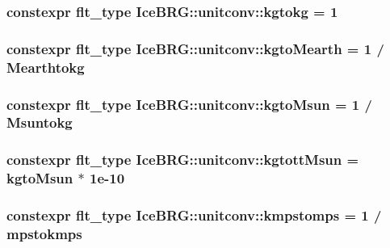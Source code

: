 \subsubsection[{kgtokg}]{\setlength{\rightskip}{0pt plus 5cm}constexpr {\bf flt\+\_\+type} Ice\+B\+R\+G\+::unitconv\+::kgtokg = 1}\label{namespaceIceBRG_1_1unitconv_a41a582b56116556e72f9829566bec57d}
\hypertarget{namespaceIceBRG_1_1unitconv_ab8172f1f5b66af0f35fea42d06f7695c}{}
\subsubsection[{kgto\+Mearth}]{\setlength{\rightskip}{0pt plus 5cm}constexpr {\bf flt\+\_\+type} Ice\+B\+R\+G\+::unitconv\+::kgto\+Mearth = 1 / {\bf Mearthtokg}}\label{namespaceIceBRG_1_1unitconv_ab8172f1f5b66af0f35fea42d06f7695c}
\hypertarget{namespaceIceBRG_1_1unitconv_a13a6d3d3f1bd4d738865aafccea48518}{}
\subsubsection[{kgto\+Msun}]{\setlength{\rightskip}{0pt plus 5cm}constexpr {\bf flt\+\_\+type} Ice\+B\+R\+G\+::unitconv\+::kgto\+Msun = 1 / {\bf Msuntokg}}\label{namespaceIceBRG_1_1unitconv_a13a6d3d3f1bd4d738865aafccea48518}
\hypertarget{namespaceIceBRG_1_1unitconv_ac142dc85ba36f5c8934dd8f92519733d}{}
\subsubsection[{kgtott\+Msun}]{\setlength{\rightskip}{0pt plus 5cm}constexpr {\bf flt\+\_\+type} Ice\+B\+R\+G\+::unitconv\+::kgtott\+Msun = {\bf kgto\+Msun} $\ast$ 1e-\/10}\label{namespaceIceBRG_1_1unitconv_ac142dc85ba36f5c8934dd8f92519733d}
\hypertarget{namespaceIceBRG_1_1unitconv_aa6a9fd9bf309f8f52029c87eab4cdbd6}{}
\subsubsection[{kmpstomps}]{\setlength{\rightskip}{0pt plus 5cm}constexpr {\bf flt\+\_\+type} Ice\+B\+R\+G\+::unitconv\+::kmpstomps = 1 / {\bf mpstokmps}}\label{namespaceIceBRG_1_1unitconv_aa6a9fd9bf309f8f52029c87eab4cdbd6}
\hypertarget{namespaceIceBRG_1_1unitconv_a7376e879917949c32e630c898b3ccef4}{}
